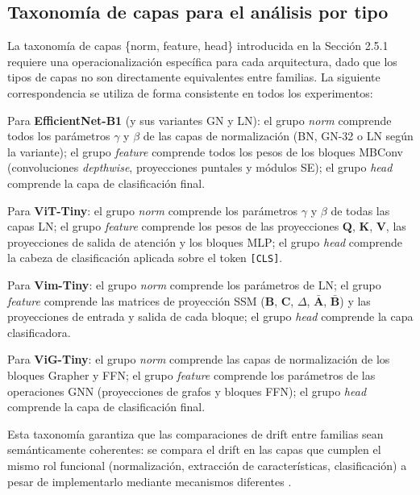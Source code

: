 \subsection{Taxonomía de capas para el análisis por tipo}

La taxonomía de capas \{norm, feature, head\} introducida en la Sección 2.5.1 requiere una
operacionalización específica para cada arquitectura, dado que los tipos de capas no son
directamente equivalentes entre familias. La siguiente correspondencia se utiliza de forma
consistente en todos los experimentos:

Para \textbf{EfficientNet-B1} (y sus variantes GN y LN): el grupo \textit{norm} comprende
todos los parámetros $\gamma$ y $\beta$ de las capas de normalización (BN, GN-32 o LN según
la variante); el grupo \textit{feature} comprende todos los pesos de los bloques MBConv
(convoluciones \textit{depthwise}, proyecciones puntales y módulos SE); el grupo \textit{head}
comprende la capa de clasificación final.

Para \textbf{ViT-Tiny}: el grupo \textit{norm} comprende los parámetros $\gamma$ y $\beta$
de todas las capas LN; el grupo \textit{feature} comprende los pesos de las proyecciones
$\mathbf{Q}$, $\mathbf{K}$, $\mathbf{V}$, las proyecciones de salida de atención y los
bloques MLP; el grupo \textit{head} comprende la cabeza de clasificación aplicada sobre el
token \texttt{[CLS]}.

Para \textbf{Vim-Tiny}: el grupo \textit{norm} comprende los parámetros de LN; el grupo
\textit{feature} comprende las matrices de proyección SSM ($\mathbf{B}$, $\mathbf{C}$, $\Delta$,
$\bar{\mathbf{A}}$, $\bar{\mathbf{B}}$) y las proyecciones de entrada y salida de cada bloque;
el grupo \textit{head} comprende la capa clasificadora.

Para \textbf{ViG-Tiny}: el grupo \textit{norm} comprende las capas de normalización de los
bloques Grapher y FFN; el grupo \textit{feature} comprende los parámetros de las operaciones
GNN (proyecciones de grafos y bloques FFN); el grupo \textit{head} comprende la capa de
clasificación final.

Esta taxonomía garantiza que las comparaciones de drift entre familias sean semánticamente
coherentes: se compara el drift en las capas que cumplen el mismo rol funcional (normalización,
extracción de características, clasificación) a pesar de implementarlo mediante mecanismos
diferentes \cite{son2022comparisons}.

